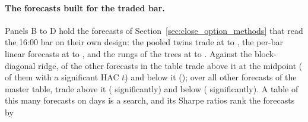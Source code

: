 \paragraph{The forecasts built for the traded bar.} Panels B to D hold the
forecasts of Section~\ref{sec:close_option_methods} that read the 16:00 bar on
their own design: the pooled twins trade at \cmPoolShMin{} to \cmPoolShMax{}, %
the per-bar linear forecasts at \cmSubShMin{} to \cmSubShMax{}, and the %
rungs of the trees at \cmNlShMin{} to \cmNlShMax{}. %
Against the block-diagonal ridge, \cmTabVsRefAbove{} of the \cmTabVsRefN{} other
forecasts in the table trade above it at the midpoint (\cmTabVsRefAboveSig{} of them with a
significant HAC $t$) and \cmTabVsRefBelow{} below it (\cmTabVsRefBelowSig{}); over all \cmMasterVsRefN{} other forecasts of the master table, %
\cmMasterVsRefAbove{} trade above it (\cmMasterVsRefAboveSig{} significantly) and %
\cmMasterVsRefBelow{} below (\cmMasterVsRefBelowSig{} significantly). A table of this
many forecasts on \cmNdays{} days is a search, and its Sharpe ratios rank the forecasts by

